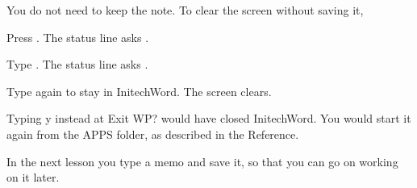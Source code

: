 You do not need to keep the note.  To clear the screen without saving it,
\begin{WPSteps}
\item Press .  The status line asks
.
\item Type .  The status line asks .
\item Type  again to stay in InitechWord.  The screen clears.
\end{WPSteps}
\EndReplay
\begin{Aside}Typing y instead at Exit WP? would have closed InitechWord.  You
would start it again from the APPS folder, as described in the
Reference.\end{Aside}
In the next lesson you type a memo and save it, so that you can go on
working on it later.
